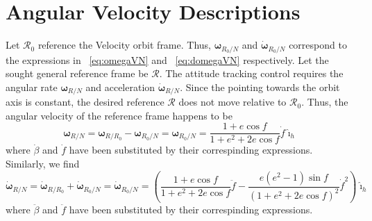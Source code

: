 \documentclass[]{AVSSimReportMemo}
\begin{document}
\section{Angular Velocity Descriptions}
Let $\mathcal{R}_{0}$ reference the Velocity orbit frame. Thus, $\bm\omega_{R_{0}/N}$ and $\dot{\bm\omega}_{R_{0}/N}$ correspond to the expressions in ~\eqref{eq:omegaVN} and ~\eqref{eq:domegaVN} respectively.
Let the sought general reference frame be $\mathcal{R}$. The attitude tracking control requires the angular rate $\bm\omega_{R/N}$ and acceleration $\dot{\bm\omega}_{R/N}$. 
Since the pointing towards the orbit axis is constant, the desired reference $\mathcal{R}$ does not move relative to $\mathcal{R}_{0}$. Thus, the angular velocity of the reference frame happens to be
\begin{equation}
  \label{eq:omega_R}
  \bm\omega_{R/N} = \bm\omega_{R/R_{0}} - \bm\omega_{R_{0}/N} = \bm\omega_{R_{0}/N} = \frac{1+e \cos f}{1+e^{2} + 2 e \cos f} \dot f \hat{\bm\imath}_{h}
\end{equation}
where $\dot\beta$ and $\dot f$ have been substituted by their correspinding expressions.\newline
Similarly, we find
\begin{equation}
  \label{eq:domega_R}
  \dot{\bm\omega}_{R/N} = \dot{\bm\omega}_{R/R_{0}} + \dot{\bm\omega}_{R_{0}/N} = \dot{\bm\omega}_{R_{0}/N} =
  \left( \frac{1+e\cos f}{1+e^{2}+2 e \cos f} \ddot f
  - \frac{
  e  (e^{2}-1)\sin f
  }{
  (1+e^{2}+2 e \cos f)^{2}
  } \dot f^{2} \right) \hat{\bm\imath}_{h}
\end{equation}
where $\ddot\beta$ and $\ddot f$ have been substituted by their correspinding expressions.



\end{document}
